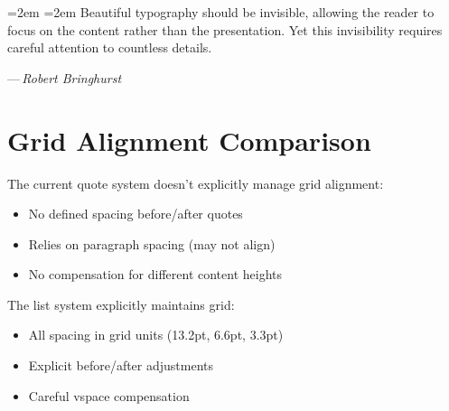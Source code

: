\documentclass[11pt]{article}
\begin{document}
\begingroup
\par\vspace{6.6pt}%
\leftskip=2em \rightskip=2em
\small \linespread{1.09}\selectfont \color[gray]{0.45}
\noindent
Beautiful typography should be invisible, allowing the reader to focus on the content rather than the presentation. Yet this invisibility requires careful attention to countless details.
\par\vspace{3.3pt}%
\hfill---\,\textit{Robert Bringhurst}
\par\vspace{6.6pt}%
\endgroup

\section{Grid Alignment Comparison}

The current quote system doesn't explicitly manage grid alignment:

\begin{itemize}
\item No defined spacing before/after quotes
\item Relies on paragraph spacing (may not align)
\item No compensation for different content heights
\end{itemize}

The list system explicitly maintains grid:

\begin{itemize}
\item All spacing in grid units (13.2pt, 6.6pt, 3.3pt)
\item Explicit before/after adjustments
\item Careful vspace compensation
\end{itemize}
\end{document}
